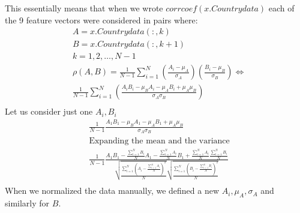 \documentclass[12pt, a4paper]{article}
\begin{document}
This essentially means that when we wrote $corrcoef(x.Countrydata)$ each of the 9 feature vectors were considered in pairs where:
\begin{equation*}
    \begin{split}
        & A = x.Countrydata(:,k) \\
        & B = x.Countrydata(:,k+1) \\
        & k=1,2,\dots,N-1 \\
        &  \rho(A,B) = \frac{1}{N-1}\sum_{i=1}^{N}{\left(\frac{A_i-\mu_A}{\sigma_A}\right)\left(\frac{B_i-\mu_B}{\sigma_B}\right)} \iff\\
        & \frac{1}{N-1} \sum_{i=1}^{N}{\left(\frac{A_iB_i -\mu_BA_i -\mu_AB_i +\mu_A\mu_B}{\sigma_A\sigma_B}\right)}\\
    \end{split}
\end{equation*}
Let us consider just one $A_i, B_i$
\begin{equation*}
    \begin{split}
        & \frac{1}{N-1} \frac{A_1B_1 -\mu_BA_1 -\mu_AB_1 +\mu_A\mu_B}{\sigma_A\sigma_B} \\
        & \text{Expanding the mean and the variance} \\
        & \frac{1}{N-1} \frac{A_1B_1 -\frac{\sum_{i=1}^{N}{B_i}}{N}A_1 -\frac{\sum_{i=1}^{N}{A_i}}{N}B_1 +\frac{\sum_{i=1}^{N}{A_i}}{N}\frac{\sum_{i=1}^{N}{B_i}}{N}}{\sqrt{\frac{\sum_{i=1}^{N}{\left(A_i-\frac{\sum_{i=1}^{N}{A_i}}{N}\right)^2}}{N}}\sqrt{\frac{\sum_{i=1}^{N}{\left(B_i-\frac{\sum_{i=1}^{N}{B_i}}{N}\right)^2}}{N}}} \\
    \end{split}
\end{equation*}
When we normalized the data manually, we defined a new $A_i, \mu_A, \sigma_A$ and similarly for $B$.
\end{document}
